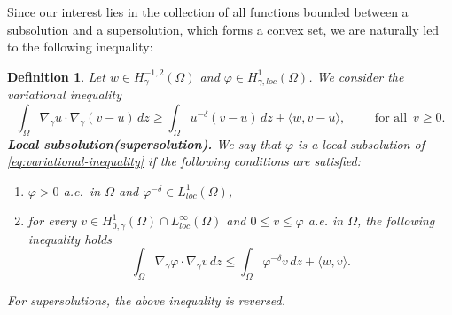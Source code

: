 \documentclass[11pt]{article}
\newtheorem{definition}{Definition}[section] %
\newcommand{\om} {\Omega}
\newcommand{\gradgr}{\nabla_{\gamma}}
\newcommand{\spacegr}{H^{1}_{0,\gamma}(\Omega)}
\begin{document}
Since our interest lies in the collection of all functions bounded between a subsolution and a supersolution, which forms a convex set, we are naturally led to the following inequality:


\begin{definition}
Let $w \in H^{-1,2}_{\gamma}(\Omega)$ and $\varphi \in H^{1}_{\gamma, loc}(\Omega)$. We consider the variational inequality
\begin{equation}
\label{eq:variational-inequality}
\int_\Omega
\gradgr u \cdot \gradgr (v-u)\,dz
\ge
\int_\Omega
u^{-\delta}(v-u)\,dz
+
\langle w, v-u \rangle,
\qquad
\text{ for all }\, v \ge 0 .
\end{equation}
\textbf{Local subsolution(supersolution).}
We say that $\varphi$ is a \emph{local subsolution} of \eqref{eq:variational-inequality} if the following conditions are satisfied:
\begin{enumerate}
\item $\varphi > 0$ a.e.\ in $\Omega$ and $\varphi^{-\delta} \in L^1_{loc}(\Omega)$,
\item for every $v \in \spacegr \cap L^\infty_{loc}(\Omega)$ and $0 \le v \le \varphi$ a.e. in $\om$, the following inequality holds
\begin{equation*}
\int_\Omega
\gradgr \varphi \cdot \gradgr v \, dz
\le
\int_\Omega
\varphi^{-\delta} v \, dz
+
\langle w , v \rangle.
\end{equation*}
\end{enumerate}
For supersolutions, the above inequality is reversed.
\end{definition}
\end{document}
